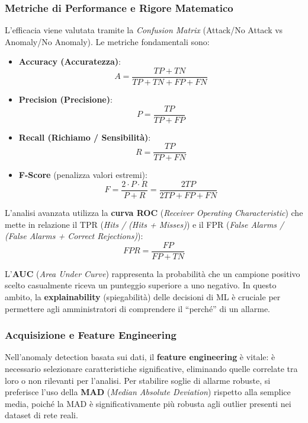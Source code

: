 \subsubsection{Metriche di Performance e Rigore Matematico}

L'efficacia viene valutata tramite la \textit{Confusion Matrix}
(Attack/No Attack vs Anomaly/No Anomaly). Le metriche fondamentali sono:

\begin{itemize}
    \item \textbf{Accuracy (Accuratezza)}:
    \[
        A = \frac{TP + TN}{TP + TN + FP + FN}
    \]
    \item \textbf{Precision (Precisione)}:
    \[
        P = \frac{TP}{TP + FP}
    \]
    \item \textbf{Recall (Richiamo / Sensibilità)}:
    \[
        R = \frac{TP}{TP + FN}
    \]
    \item \textbf{F-Score} (penalizza valori estremi):
    \[
        F = \frac{2 \cdot P \cdot R}{P + R} = \frac{2TP}{2TP + FP + FN}
    \]
\end{itemize}

L'analisi avanzata utilizza la \textbf{curva ROC}
(\textit{Receiver Operating Characteristic}) che mette in relazione il
TPR (\textit{Hits / (Hits + Misses)}) e il FPR (\textit{False Alarms /
(False Alarms + Correct Rejections)}):
\[
    FPR = \frac{FP}{FP + TN}
\]

L'\textbf{AUC} (\textit{Area Under Curve}) rappresenta la probabilità
che un campione positivo scelto casualmente riceva un punteggio
superiore a uno negativo. In questo ambito, la
\textbf{explainability} (spiegabilità) delle decisioni di ML è cruciale
per permettere agli amministratori di comprendere il ``perché'' di un
allarme.

\subsubsection{Acquisizione e Feature Engineering}

Nell'anomaly detection basata sui dati, il \textbf{feature engineering}
è vitale: è necessario selezionare caratteristiche significative,
eliminando quelle correlate tra loro o non rilevanti per l'analisi. Per
stabilire soglie di allarme robuste, si preferisce l'uso della
\textbf{MAD} (\textit{Median Absolute Deviation}) rispetto alla semplice
media, poiché la MAD è significativamente più robusta agli outlier
presenti nei dataset di rete reali.

